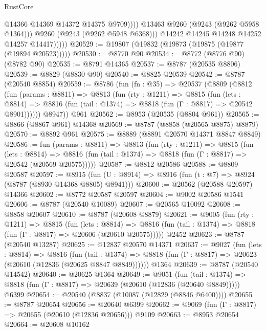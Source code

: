 \begin{lexlean}{RustCore}
\begin{coremodule}
                          @14366
                          @14369
                          @14372
                          @14375
                          @9709))))
                  @13463
                  @9260
                  (@9243 (@9262 @5958 @1364)))
                @9260
                (@9243 (@9262 @5948 @6368)))
              @14242
              @14245
              @14248
              @14252
              @14257
              @14417)))))
@20529 := @19807 (@19832 (@19873 (@19875 (@19877 (@19894 @20523)))))
@20530 := @8770 @90
@20534 := @8772 (@8776 @90) (@8782 @90)
@20535 := @8791 @14365
@20537 := @8787 (@20535 @8806)
@20539 := @8829 (@8830 @90)
@20540 := @8825 @20539
@20542 := @8787 (@20540 @8854)
@20559 := @8786
    (fun (fn : @35) =>
    @20537
      (@8809
        (@8812
          (fun (params : @8811) =>
          @8813
            (fun (rty : @1211) =>
            @8815
              (fun (lets : @8814) =>
              @8816 (fun (tail : @1374) => @8818 (fun (Γ : @8817) => @20542 @8901))))))
        @8947))
    @961
@20562 := @8953 (@20535 (@8804 @961))
@20565 := @8866 (@8867 @961) @14368
@20569 := @8787 (@8858 (@20565 @8875) @8879)
@20570 := @8892 @961
@20575 := @8889 (@8891 @20570 @14371 @8847 @8849)
@20586 := fun (params : @8811) =>
  @8813
    (fun (rty : @1211) =>
    @8815
      (fun (lets : @8814) =>
      @8816 (fun (tail : @1374) => @8818 (fun (Γ : @8817) => @20542 (@20569 @20575)))))
@20587 := @8812 @20586
@20588 := @8809 @20587
@20597 := @8915
    (fun (U : @8914) => @8916 (fun (t : @7) => @8924 (@8787 (@8930 @14368 @8805) @8941)))
@20600 := @20562 (@20588 @20597) @14366
@20602 := @8772 @20587 @20597
@20604 := @9002 @20586 @1541
@20606 := @8787 (@20540 @10089)
@20607 := @20565 @10092
@20608 := @8858 @20607
@20610 := @8787 (@20608 @8879)
@20621 := @9005
    (fun (rty : @1211) =>
    @8815
      (fun (lets : @8814) =>
      @8816 (fun (tail : @1374) => @8818 (fun (Γ : @8817) => @20606 (@20610 @20575)))))
    @2452
@20623 := @8787 (@20540 @13287)
@20625 := @12837 @20570 @14371
@20637 := @9027
    (fun (lets : @8814) =>
    @8816
      (fun (tail : @1374) =>
      @8818 (fun (Γ : @8817) => @20623 (@20610 (@12836 (@20625 @8847 @8849))))))
    @1364
@20639 := @8787 (@20540 @14542)
@20640 := @20625 @1364
@20649 := @9051
    (fun (tail : @1374) => @8818 (fun (Γ : @8817) => @20639 (@20610 (@12836 (@20640 @8849)))))
    @6399
@20654 := @20540 (@8837 (@10087 (@12829 (@8846 @6400))))
@20655 := @8787 @20654
@20656 := @20640 @6399
@20662 := @9069 (fun (Γ : @8817) => @20655 (@20610 (@12836 @20656))) @9109
@20663 := @8953 @20654
@20664 := @20608 @10162

\end{coremodule}
\end{lexlean}
